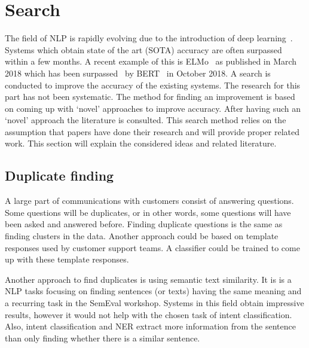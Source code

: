 \section{Search}
\label{sec:search}

The field of NLP is rapidly evolving due to the introduction of deep learning~\citep{cambria2014jumping}.
Systems which obtain state of the art (SOTA) accuracy are often surpassed within a few months.
A recent example of this is ELMo~\citep{peters2018} as published in March 2018 which has been surpassed~\citep{young2018recent} by BERT~\citep{devlin2018} in October 2018.
A search is conducted to improve the accuracy of the existing systems.
The research for this part has not been systematic.
The method for finding an improvement is based on coming up with `novel' approaches to improve accuracy.
After having such an `novel' approach the literature is consulted.
This search method relies on the assumption that papers have done their research and will provide proper related work.
This section will explain the considered ideas and related literature.

\subsection{Duplicate finding}
\label{subsec:duplicate_finding}
A large part of communications with customers consist of answering questions.
Some questions will be duplicates, or in other words, some questions will have been asked and answered before.
Finding duplicate questions is the same as finding clusters in the data.
Another approach could be based on template responses used by customer support teams.
A classifier could be trained to come up with these template responses.

Another approach to find duplicates is using semantic text similarity.
It is is a NLP tasks focusing on finding sentences (or texts) having the same meaning and a recurring task in the SemEval workshop.
Systems in this field obtain impressive results, however it would not help with the chosen task of intent classification.
Also, intent classification and NER extract more information from the sentence than only finding whether there is a similar sentence.

